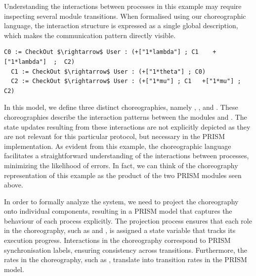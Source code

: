 Understanding the interactions between processes in this example may require inspecting 
several module transitions. 
When formalised using our choreographic language, 
the interaction structure is expressed as a single global description, 
which makes the communication pattern directly visible.
\begin{lstlisting}[style=chor-color,% caption={Example of Listing \ref{example1} in our choreographic language},captionpos=b,
  frame=none, label={example2}]
  C0 := CheckOut $\rightarrow$ User : (+["1*lambda"] ; C1	 +["1*lambda"]  ;  C2)
  C1 := CheckOut $\rightarrow$ User : (+["1*theta"] ; C0)  
  C2 := CheckOut $\rightarrow$ User : (+["1*mu"] ; C1   +["1*mu"] ;  C2)
\end{lstlisting}
In this model, we define three distinct choreographies, namely
, , and . These choreographies
describe the interaction patterns between the modules 
and . The state updates resulting from these
interactions are not explicitly depicted as they are not relevant for
this particular protocol, but necessary in the PRISM implementation.
%
%
As evident from this example, the choreographic language facilitates a
straightforward understanding of the interactions between processes,
minimizing the likelihood of errors. In fact, we can think of the
choreography representation of this example as the product of the two
PRISM modules seen above.


In order to formally analyze the system, we need to project the
choreography onto individual components, resulting in a PRISM model
that captures the behaviour of each process explicitly. The projection
process ensures that each role in the choreography, such as
 and , is assigned a state variable
that tracks its execution progress. Interactions in the choreography
correspond to PRISM synchronisation labels, ensuring consistency
across transitions. Furthermore, the rates in the choreography, such
as ,
translate into transition rates in the PRISM model.


